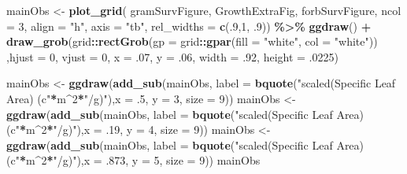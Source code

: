 \documentclass[
]{article}
\newenvironment{Shaded}{\begin{snugshade}}{\end{snugshade}}
\newcommand{\DataTypeTok}[1]{\textcolor[rgb]{0.13,0.29,0.53}{#1}}
\newcommand{\DecValTok}[1]{\textcolor[rgb]{0.00,0.00,0.81}{#1}}
\newcommand{\FloatTok}[1]{\textcolor[rgb]{0.00,0.00,0.81}{#1}}
\newcommand{\KeywordTok}[1]{\textcolor[rgb]{0.13,0.29,0.53}{\textbf{#1}}}
\newcommand{\NormalTok}[1]{#1}
\newcommand{\OperatorTok}[1]{\textcolor[rgb]{0.81,0.36,0.00}{\textbf{#1}}}
\newcommand{\StringTok}[1]{\textcolor[rgb]{0.31,0.60,0.02}{#1}}
\begin{document}
\begin{Shaded}
\begin{Highlighting}[]
\NormalTok{mainObs \textless{}{-}}\StringTok{ }\KeywordTok{plot\_grid}\NormalTok{( gramSurvFigure, GrowthExtraFig, forbSurvFigure, }\DataTypeTok{ncol =} \DecValTok{3}\NormalTok{, }\DataTypeTok{align =} \StringTok{"h"}\NormalTok{, }\DataTypeTok{axis =} \StringTok{"tb"}\NormalTok{, }\DataTypeTok{rel\_widths =} \KeywordTok{c}\NormalTok{(.}\DecValTok{9}\NormalTok{,}\DecValTok{1}\NormalTok{, }\FloatTok{.9}\NormalTok{)) }\OperatorTok{\%\textgreater{}\%}\StringTok{ }
\StringTok{  }\KeywordTok{ggdraw}\NormalTok{() }\OperatorTok{+}\StringTok{ }\KeywordTok{draw\_grob}\NormalTok{(grid}\OperatorTok{::}\KeywordTok{rectGrob}\NormalTok{(}\DataTypeTok{gp =}\NormalTok{ grid}\OperatorTok{::}\KeywordTok{gpar}\NormalTok{(}\DataTypeTok{fill =} \StringTok{"white"}\NormalTok{, }\DataTypeTok{col =} \StringTok{"white"}\NormalTok{)) ,}\DataTypeTok{hjust =} \DecValTok{0}\NormalTok{, }\DataTypeTok{vjust =} \DecValTok{0}\NormalTok{, }\DataTypeTok{x =} \FloatTok{.07}\NormalTok{, }\DataTypeTok{y =} \FloatTok{.06}\NormalTok{, }\DataTypeTok{width =} \FloatTok{.92}\NormalTok{, }\DataTypeTok{height =} \FloatTok{.0225}\NormalTok{) }

\NormalTok{mainObs \textless{}{-}}\StringTok{ }\KeywordTok{ggdraw}\NormalTok{(}\KeywordTok{add\_sub}\NormalTok{(mainObs, }\DataTypeTok{label =} \KeywordTok{bquote}\NormalTok{(}\StringTok{"scaled(Specific Leaf Area) (c"}\OperatorTok{*}\NormalTok{m}\OperatorTok{\^{}}\DecValTok{2}\OperatorTok{*}\StringTok{"/g)"}\NormalTok{),}\DataTypeTok{x =} \FloatTok{.5}\NormalTok{, }\DataTypeTok{y =} \DecValTok{3}\NormalTok{, }\DataTypeTok{size =} \DecValTok{9}\NormalTok{))}
\NormalTok{mainObs \textless{}{-}}\StringTok{ }\KeywordTok{ggdraw}\NormalTok{(}\KeywordTok{add\_sub}\NormalTok{(mainObs, }\DataTypeTok{label =} \KeywordTok{bquote}\NormalTok{(}\StringTok{"scaled(Specific Leaf Area) (c"}\OperatorTok{*}\NormalTok{m}\OperatorTok{\^{}}\DecValTok{2}\OperatorTok{*}\StringTok{"/g)"}\NormalTok{),}\DataTypeTok{x =} \FloatTok{.19}\NormalTok{, }\DataTypeTok{y =} \DecValTok{4}\NormalTok{, }\DataTypeTok{size =} \DecValTok{9}\NormalTok{))}
\NormalTok{mainObs \textless{}{-}}\StringTok{ }\KeywordTok{ggdraw}\NormalTok{(}\KeywordTok{add\_sub}\NormalTok{(mainObs, }\DataTypeTok{label =} \KeywordTok{bquote}\NormalTok{(}\StringTok{"scaled(Specific Leaf Area) (c"}\OperatorTok{*}\NormalTok{m}\OperatorTok{\^{}}\DecValTok{2}\OperatorTok{*}\StringTok{"/g)"}\NormalTok{),}\DataTypeTok{x =} \FloatTok{.873}\NormalTok{, }\DataTypeTok{y =} \DecValTok{5}\NormalTok{, }\DataTypeTok{size =} \DecValTok{9}\NormalTok{))}
\NormalTok{mainObs}
\end{Highlighting}
\end{Shaded}
\end{document}
